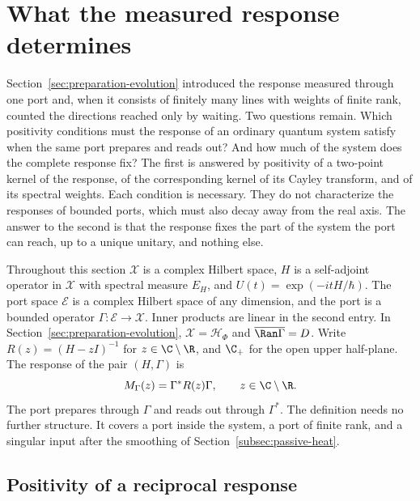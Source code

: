 \section{What the measured response determines}
\label{sec:passive-response}

Section~\ref{sec:preparation-evolution} introduced the response measured through one port and, when it consists of finitely many lines with weights of finite rank, counted the directions reached only by waiting. Two questions remain. Which positivity conditions must the response of an ordinary quantum system satisfy when the same port prepares and reads out? And how much of the system does the complete response fix? The first is answered by positivity of a two-point kernel of the response, of the corresponding kernel of its Cayley transform, and of its spectral weights. Each condition is necessary. They do not characterize the responses of bounded ports, which must also decay away from the real axis. The answer to the second is that the response fixes the part of the system the port can reach, up to a unique unitary, and nothing else.

Throughout this section $\mathcal X$ is a complex Hilbert space, $H$ is a self-adjoint operator in $\mathcal X$ with spectral measure $E_H$, and $U(t)=\exp(-itH/\hbar)$. The port space $\mathcal E$ is a complex Hilbert space of any dimension, and the port is a bounded operator $\Gamma:\mathcal E\to\mathcal X$. Inner products are linear in the second entry. In Section~\ref{sec:preparation-evolution}, $\mathcal X=\mathcal H_\Phi$ and $\overline{\Ran\Gamma}=D$. Write $R(z)=(H-zI)^{-1}$ for $z\in\C\setminus\R$, and $\C_+$ for the open upper half-plane. The response of the pair $(H,\Gamma)$ is
\begin{equation}
 M_\Gamma(z)=\Gamma^*R(z)\Gamma,\qquad z\in\C\setminus\R .
 \label{eq:passive-response}
\end{equation}
The port prepares through $\Gamma$ and reads out through $\Gamma^*$. The definition needs no further structure. It covers a port inside the system, a port of finite rank, and a singular input after the smoothing of Section~\ref{subsec:passive-heat}.

\subsection{Positivity of a reciprocal response}
\label{subsec:passive-positivity}

